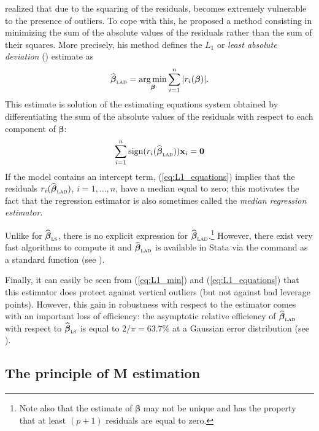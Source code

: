 \citet{edgeworth:1887} realized that due to the squaring of the residuals,
 becomes extremely vulnerable to the presence of outliers. To cope
with this, he proposed a method consisting in minimizing the sum of the
absolute values of the residuals rather than the sum of their squares. More
precisely, his method defines the $L_{1}$ or \emph{least absolute deviation}
() estimate as
%
\begin{equation}\label{eq:L1_min}
    \sthat{\boldsymbol\beta}_{\stsc{LAD}} 
        = \argmin_{\boldsymbol\beta} \sum_{i=1}^{n} |r_{i}(\boldsymbol\beta)|.
\end{equation}
%
This estimate is solution of the estimating equations system obtained by
differentiating the sum of the absolute values of the residuals with respect
to each component of $\boldsymbol\beta$:
%
\begin{equation}\label{eq:L1_equations}
    \sum_{i=1}^{n}\sign(r_{i}(\sthat{\boldsymbol\beta}_{\stsc{LAD}})) 
    \stvec{x}_{i} = \stvec{0}
\end{equation}
%
If the model contains an intercept term, (\ref{eq:L1_equations}) implies that
the residuals $r_{i}(\sthat{\boldsymbol\beta}_{\stsc{LAD}})$, $i = 1, \dots,
n$, have a median equal to zero; this motivates the fact that the 
regression estimator is also sometimes called the \emph{median regression
estimator}.

Unlike for $\sthat{\boldsymbol\beta}_{\stsc{LS}}$, there is no explicit
expression for $\sthat{\boldsymbol\beta}_{\stsc{LAD}}$.\footnote{Note also that
the  estimate of $\boldsymbol\beta$ may not be unique and has the
property that at least $(p+1)$ residuals are equal to zero.} However, there
exist very fast algorithms to compute it and
$\sthat{\boldsymbol{\beta}}_{\stsc{LAD}}$ is available in Stata via the
 command as a standard function (see ).

Finally, it can easily be seen from (\ref{eq:L1_min}) and
(\ref{eq:L1_equations}) that this estimator does protect against vertical
outliers (but not against bad leverage points). However, this gain in
robustness with respect to the  estimator comes with an important loss
of efficiency: the asymptotic relative efficiency of
$\sthat{\boldsymbol{\beta}}_{\stsc{LAD}}$ with respect to
$\sthat{\boldsymbol\beta}_{\stsc{LS}}$ is equal to $2/\pi = 63.7\%$ at a
Gaussian error distribution (see \citealp{huber:1981}).

\subsection{The principle of M estimation}

